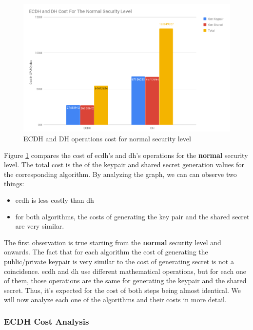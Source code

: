 \documentclass{llncs}
\begin{document}
\begin{figure}
  \centering
  \includegraphics[width=1.0\textwidth]{img/ecdh-dh-cost-normal-sl.png}
  \centering \caption{\label{fig:ecdh-dh-cost-normal-sl} ECDH and DH operations cost for normal security level}
\end{figure}

Figure \ref{fig:ecdh-dh-cost-normal-sl} compares the cost of \gls{ecdh}'s and \gls{dh}'s operations for the \textbf{normal} security level.
The total cost is the of the keypair and shared secret generation values for the corresponding algorithm. By analyzing the graph, we can can 
observe two things:

\begin{itemize}
  \item \gls{ecdh} is less costly than \gls{dh}
  \item for both algorithms, the costs of generating the key pair and the shared secret are very similar.
\end{itemize}

The first observation is true starting from the \textbf{normal} security level and onwards.
The fact that for each algorithm the cost of generating the public/private keypair is very similar to the cost of generating secret is not a coincidence.
\gls{ecdh} and \gls{dh} use different mathematical operations, but for each one of them, those operations are the same for generating the keypair 
and the shared secret. Thus, it's expected for the cost of both steps being almost identical. We will now analyze each one of the algorithms and 
their costs in more detail.

\subsubsection{ECDH Cost Analysis}
\end{document}

